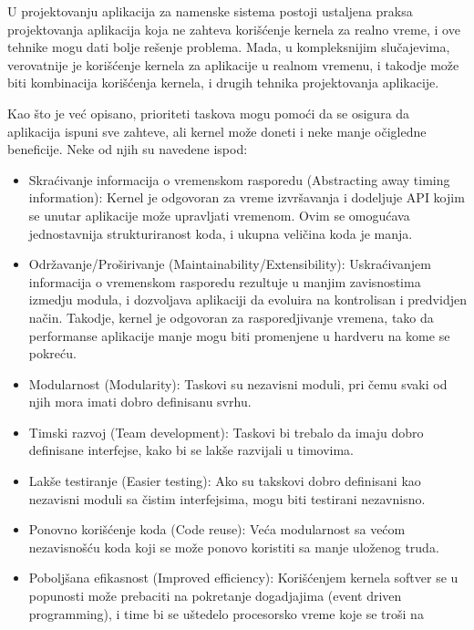 \documentclass[a4paper,12pt, master]{etf}
\begin{document}
	U projektovanju aplikacija za namenske sistema postoji ustaljena praksa projektovanja
	aplikacija koja ne zahteva kori\v{s}\'{c}enje kernela za realno vreme, i ove tehnike mogu dati
	bolje re\v{s}enje problema. Mada, u kompleksnijim slu\v{c}ajevima, verovatnije je kori\v{s}\'{c}enje
	kernela za aplikacije u realnom vremenu, i takodje mo\v{z}e biti kombinacija kori\v{s}\'{c}enja
	kernela, i drugih tehnika projektovanja aplikacije.

	Kao \v{s}to je ve\'{c} opisano, prioriteti taskova mogu pomo\'{c}i da se osigura da aplikacija ispuni
	sve zahteve, ali kernel mo\v{z}e doneti i neke manje o\v{c}igledne beneficije. Neke od njih su
	navedene ispod:

	\begin{itemize}
		\item Skra\'{c}ivanje informacija o vremenskom rasporedu (Abstracting away timing information):
		Kernel je odgovoran za vreme izvr\v{s}avanja i dodeljuje API kojim se
		unutar aplikacije mo\v{z}e upravljati vremenom. Ovim se omogu\'{c}ava jednostavnija
		strukturiranost koda, i ukupna veli\v{c}ina koda je manja.
		\item Odr\v{z}avanje/Pro\v{s}irivanje (Maintainability/Extensibility):
		Uskra\'{c}ivanjem informacija o vremenskom rasporedu rezultuje u manjim zavisnostima
		izmedju	modula, i dozvoljava aplikaciji da evoluira na kontrolisan i predvidjen
		na\v{c}in. Takodje, kernel je odgovoran za rasporedjivanje vremena, tako da performanse
		aplikacije manje mogu biti promenjene u hardveru na kome se pokre\'{c}u.
		\item Modularnost (Modularity):
		Taskovi su nezavisni moduli, pri \v{c}emu svaki od njih mora imati dobro definisanu svrhu.
		\item Timski razvoj (Team development):
		Taskovi bi trebalo da imaju dobro definisane interfejse, kako bi se lak\v{s}e razvijali u
		timovima.
		\item Lak\v{s}e testiranje (Easier testing):
		Ako su takskovi dobro definisani kao nezavisni moduli sa \v{c}istim interfejsima, mogu biti
		testirani nezavnisno.
		\item Ponovno kori\v{s}\'{c}enje koda (Code reuse):
		Ve\'{c}a modularnost sa ve\'{c}om nezavisno\v{s}\'{c}u koda koji se mo\v{z}e ponovo koristiti
		sa manje ulo\v{z}enog truda.
		\item Pobolj\v{s}ana efikasnost (Improved efficiency):
		Kori\v{s}\'{c}enjem kernela softver se u popunosti mo\v{z}e prebaciti na pokretanje dogadjajima
		(event driven programming), i time bi se u\v{s}tedelo procesorsko vreme koje se tro\v{s}i na

\end{itemize}
\end{document}
